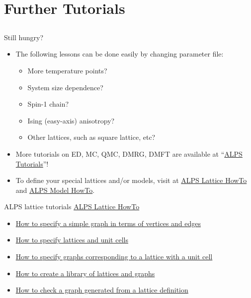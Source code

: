 \section{Further Tutorials}
\subsection*{\redb\blueb\greenb}

\begin{frame}[t,fragile]{Still hungry?}
  \begin{itemize}
  \item The following lessons can be done easily by changing parameter file:
    \begin{itemize}
    \item More temperature points?
    \item System size dependence?
    \item Spin-1 chain?
    \item Ising (easy-axis) anisotropy?
    \item Other lattices, such as square lattice, etc?
    \end{itemize}
  \item More tutorials on ED, MC, QMC, DMRG, DMFT are available at ``\href{http://alps.comp-phys.org/mediawiki/index.php/ALPS_2_Tutorials:Overview}{ALPS Tutorials}''!
  \item To define your special lattices and/or models, visit at \href{http://alps.comp-phys.org/mediawiki/index.php/Tutorials:LatticeHOWTO}{ALPS Lattice HowTo} and \href{http://alps.comp-phys.org/mediawiki/index.php/Tutorials:ModelHOWTO}{ALPS Model HowTo}.
  \end{itemize}
\end{frame}

\begin{frame}[t,fragile]{ALPS lattice tutorials}
  \href{http://alps.comp-phys.org/mediawiki/index.php/Tutorials:LatticeHOWTO}{ALPS Lattice HowTo} \\
  \begin{itemize}
    \item \href{http://alps.comp-phys.org/mediawiki/index.php/Tutorials:LatticeHOWTO:SimpleGraphs}{How to specify a simple graph in terms of vertices and edges}
    \item \href{http://alps.comp-phys.org/mediawiki/index.php/Tutorials:LatticesAndUnitCells}{How to specify lattices and unit cells}
    \item \href{http://alps.comp-phys.org/mediawiki/index.php/Tutorials:LatticesAndGraphs}{How to specify graphs corresponding to a lattice with a unit cell}
    \item \href{http://alps.comp-phys.org/mediawiki/index.php/Tutorials:LatticeHOWTO:Library}{How to create a library of lattices and graphs}
    \item \href{http://alps.comp-phys.org/mediawiki/index.php/Tutorials:LatticeHowto:CheckLattice}{How to check a graph generated from a lattice definition}
  \end{itemize}
\end{frame}


